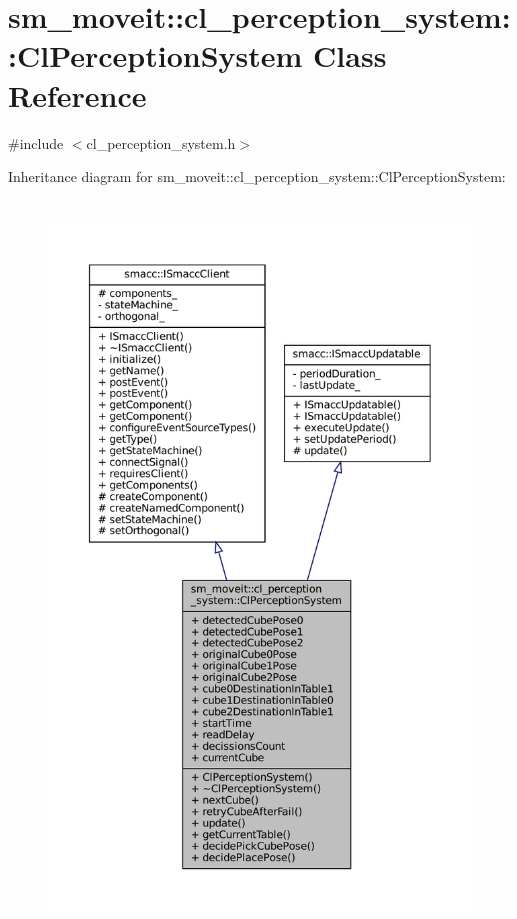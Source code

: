 \hypertarget{classsm__moveit_1_1cl__perception__system_1_1ClPerceptionSystem}{}\section{sm\+\_\+moveit\+:\+:cl\+\_\+perception\+\_\+system\+:\+:Cl\+Perception\+System Class Reference}
\label{classsm__moveit_1_1cl__perception__system_1_1ClPerceptionSystem}


{\ttfamily \#include $<$cl\+\_\+perception\+\_\+system.\+h$>$}



Inheritance diagram for sm\+\_\+moveit\+:\+:cl\+\_\+perception\+\_\+system\+:\+:Cl\+Perception\+System\+:
\nopagebreak
\begin{figure}[H]
\begin{center}
\leavevmode
\includegraphics[height=550pt]{classsm__moveit_1_1cl__perception__system_1_1ClPerceptionSystem__inherit__graph}
\end{center}
\end{figure}



